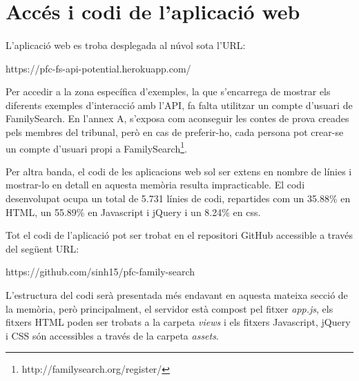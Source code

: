 \section{Accés i codi de l'aplicació web}

    \paragraph{}
    L’aplicació web es troba desplegada al núvol sota l'URL:

    \begin{displayquote}
        https://pfc-fs-api-potential.herokuapp.com/
    \end{displayquote}

    Per accedir a la zona específica d’exemples, la que s’encarrega de mostrar els diferents exemples d’interacció amb l’API, fa falta utilitzar un compte d’usuari de FamilySearch. En l’annex A, s'exposa com aconseguir les contes de prova creades pels membres del tribunal, però en cas de preferir-ho, cada persona pot crear-se un compte d’usuari propi a FamilySearch\footnote{http://familysearch.org/register/}.

    Per altra banda, el codi de les aplicacions web sol ser extens en nombre de línies i mostrar-lo en detall en aquesta memòria resulta impracticable. El codi desenvolupat ocupa un total de 5.731 línies de codi, repartides com un 35.88\% en HTML, un 55.89\% en Javascript i jQuery i un 8.24\% en css.

    Tot el codi de l’aplicació pot ser trobat en el repositori GitHub accessible a través del següent URL:

    \begin{displayquote}
        https://github.com/sinh15/pfc-family-search
    \end{displayquote}

    L’estructura del codi serà presentada més endavant en aquesta mateixa secció de la memòria, però principalment, el servidor està compost pel fitxer \emph{app.js}, els fitxers HTML poden ser trobats a la carpeta \emph{views} i els fitxers Javascript, jQuery i CSS són accessibles a través de la carpeta \emph{assets}.
